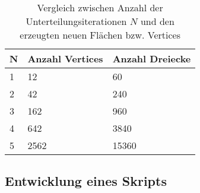 \begin{table}
  \caption{Vergleich zwischen Anzahl der Unterteilungsiterationen $N$ und den erzeugten neuen Flächen bzw. Vertices}
  \label{table:icosahedron-complexity}
  \begin{tabularx}{\columnwidth}{lXX}
    \textbf{N} & \textbf{Anzahl Vertices} & \textbf{Anzahl Dreiecke} \\
    \hline
    1 & 12   & 60 \\
    2 & 42   & 240 \\
    3 & 162  & 960 \\
    4 & 642  & 3840 \\
    5 & 2562 & 15360
  \end{tabularx}
\end{table}


\subsection{Entwicklung eines Skripts}
